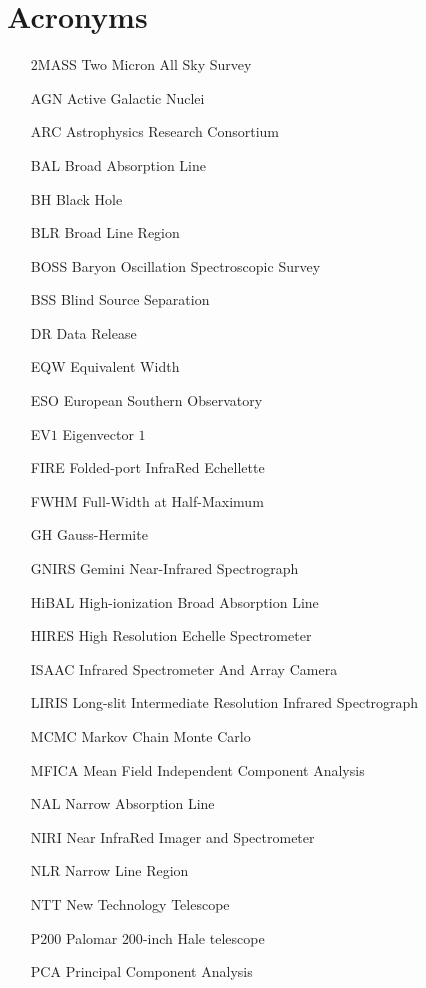     \chapter*{Acronyms}
    \begin{itemize}
      \item[$2$MASS]{Two Micron All Sky Survey}
      \item[AGN]{Active Galactic Nuclei}
      \item[ARC]{Astrophysics Research Consortium}
      \item[BAL]{Broad Absorption Line}
      \item[BH]{Black Hole}
      \item[BLR]{Broad Line Region}
      \item[BOSS]{Baryon Oscillation Spectroscopic Survey}
      \item[BSS]{Blind Source Separation}
      \item[DR]{Data Release}
      \item[EQW]{Equivalent Width}
      \item[ESO]{European Southern Observatory} 
      \item[EV$1$]{Eigenvector $1$} 
      \item[FIRE]{Folded-port InfraRed Echellette}
      \item[FWHM]{Full-Width at Half-Maximum}
      \item[GH]{Gauss-Hermite}
      \item[GNIRS]{Gemini Near-Infrared Spectrograph}
      \item[HiBAL]{High-ionization Broad Absorption Line} 
      \item[HIRES]{High Resolution Echelle Spectrometer}
      \item[ISAAC]{Infrared Spectrometer And Array Camera}
      \item[LIRIS]{Long-slit Intermediate Resolution Infrared Spectrograph}
      \item[MCMC]{Markov Chain Monte Carlo}
      \item[MFICA]{Mean Field Independent Component Analysis}
      \item[NAL]{Narrow Absorption Line}
      \item[NIRI]{Near InfraRed Imager and Spectrometer}
      \item[NLR]{Narrow Line Region}
      \item[NTT]{New Technology Telescope} 
      \item[P$200$]{Palomar $200$-inch Hale telescope}
      \item[PCA]{Principal Component Analysis}

\end{itemize}
